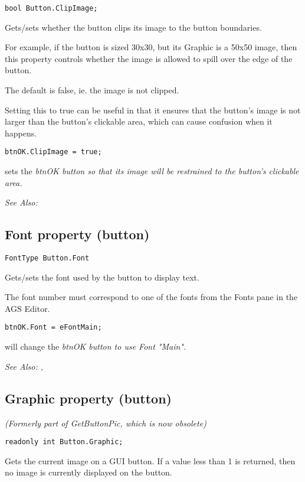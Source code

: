 \begin{verbatim}
bool Button.ClipImage;
\end{verbatim}
Gets/sets whether the button clips its image to the button boundaries.

For example, if the button is sized 30x30, but its Graphic is a 50x50 image, then
this property controls whether the image is allowed to spill over the edge of the button.

The default is false, ie. the image is not clipped.

Setting this to true can be useful in that it ensures that the button's image is not larger
than the button's clickable area, which can cause confusion when it happens.

\begin{verbatim}
btnOK.ClipImage = true;
\end{verbatim}
sets the \it{btnOK} button so that its image will be restrained to the button's clickable area.

\it{See Also:} 


\subsection{Font property (button)}\label{Button.Font}%

\begin{verbatim}
FontType Button.Font
\end{verbatim}
Gets/sets the font used by the button to display text.

The font number must correspond to one of the fonts from the Fonts pane in the AGS Editor.

\begin{verbatim}
btnOK.Font = eFontMain;
\end{verbatim}
will change the \it{btnOK} button to use Font "Main".

\it{See Also:} , 


\subsection{Graphic property (button)}\label{Button.Graphic}%

\it{(Formerly part of GetButtonPic, which is now obsolete)}

\begin{verbatim}
readonly int Button.Graphic;
\end{verbatim}
Gets the current image on a GUI button. If a value less than 1 is returned,
then no image is currently displayed on the button.


